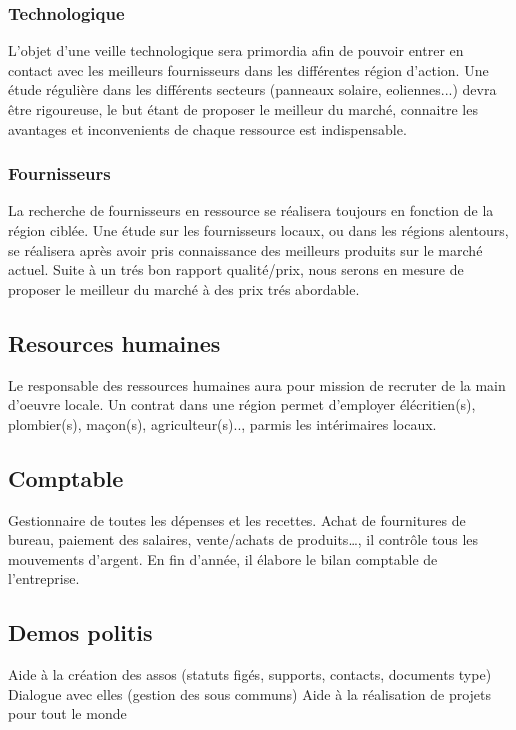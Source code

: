 \documentclass[10pt]{article}
\begin{document}
\subsubsection{Technologique}
\label{ssub:}
L'objet d'une veille technologique sera primordia afin de pouvoir entrer en contact avec les meilleurs fournisseurs dans les différentes région d'action. Une étude régulière dans les différents secteurs (panneaux solaire, eoliennes...) devra être rigoureuse, le but étant de proposer le meilleur du marché, connaitre les avantages et inconvenients de chaque ressource est indispensable.


\subsubsection{Fournisseurs}
\label{ssub:}
La recherche de fournisseurs en ressource se réalisera toujours en fonction de la région ciblée. Une étude sur les fournisseurs locaux, ou dans les régions alentours, se réalisera après avoir pris connaissance des meilleurs produits sur le marché actuel. Suite à un trés bon rapport qualité/prix, nous serons en mesure de proposer le meilleur du marché à des prix trés abordable.


\subsection{Resources humaines}
\label{sec:rh}
Le responsable des ressources humaines aura pour mission de recruter de la main d'oeuvre locale. Un contrat dans une région permet d'employer élécritien(s), plombier(s), maçon(s), agriculteur(s).., parmis les intérimaires locaux.

\subsection{Comptable}
\label{sec:}
Gestionnaire de toutes les dépenses et les recettes. Achat de fournitures de bureau, paiement des salaires, vente/achats de produits…, il contrôle tous les mouvements d’argent. En fin d’année, il élabore le bilan comptable de l’entreprise. 

\subsection{Demos politis}
\label{sec:}
Aide à la création des assos (statuts figés, supports, contacts, documents type)
Dialogue avec elles (gestion des sous communs)
Aide à la réalisation de projets pour tout le monde
\end{document}
